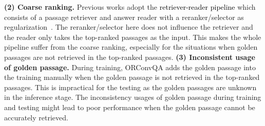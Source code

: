 \textbf{(2) Coarse ranking.} 
Previous works adopt the \textcolor{black}{retriever-reader pipeline} which consists of a passage retriever and answer reader with a reranker/selector as regularization~\cite{yang2019end,karpukhin2020dense,qu2020open}. 
The reranker/selector here does not influence the retriever and the reader only takes the top-ranked passages as the input.
This makes the whole pipeline suffer from the coarse ranking, 
especially for the situations when golden passages are not retrieved in the top-ranked passages.
\textbf{(3) Inconsistent usage of golden passage.} 
During training, ORConvQA adds the golden passage into the training manually when the golden passage is not retrieved in the top-ranked passages. This is impractical for the testing as the golden passages are unknown in the inference stage. The inconsistency usages of golden passage during training and testing might lead to poor performance when the golden passage cannot be accurately retrieved.


